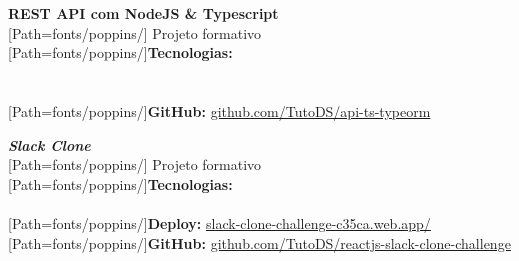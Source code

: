 \begin{minipage}{.5\textwidth}
\textbf{REST API com NodeJS \& Typescript}\\[3pt]
{
	\scriptsize
	[Path=fonts/poppins/]
	Projeto formativo\\[2pt]

	{[Path=fonts/poppins/]\textbf{Tecnologias:}}\\
	   \\[1pt]   \\[2pt]

	{[Path=fonts/poppins/]\textbf{GitHub:}} \href{https://github.com/TutoDS/api-ts-typeorm}{github.com/TutoDS/api-ts-typeorm}
}
\end{minipage}
\begin{minipage}{.5\textwidth}
	\textbf{\textit{Slack Clone}}\\[3pt]
	{
		\scriptsize
		[Path=fonts/poppins/]
		Projeto formativo\\[2pt]

		{[Path=fonts/poppins/]\textbf{Tecnologias:}}\\
		   \\[2pt]

		{[Path=fonts/poppins/]\textbf{Deploy:}} \href{https://slack-clone-challenge-c35ca.web.app/}{slack-clone-challenge-c35ca.web.app/}\\
		{[Path=fonts/poppins/]\textbf{GitHub:}} \href{https://github.com/TutoDS/reactjs-slack-clone-challenge}{github.com/TutoDS/reactjs-slack-clone-challenge}
	}
\end{minipage}

\vspace{10pt}

